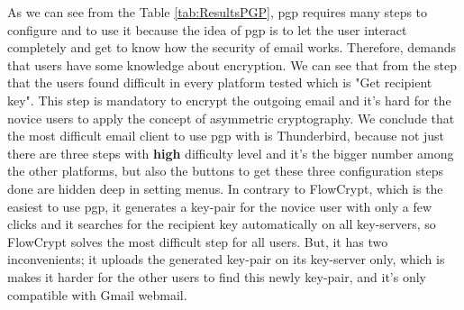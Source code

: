 As we can see from the Table \ref{tab:ResultsPGP}, \acrshort{pgp} requires many steps to configure and to use it because the idea of \acrshort{pgp} is to let the user interact completely and get to know how the security of email works. Therefore, demands that users have some knowledge about encryption. We can see that from the step that the users found difficult in every platform tested which is "Get recipient key". This step is mandatory to encrypt the outgoing email and it’s hard for the novice users to apply the concept of asymmetric cryptography. We conclude that the most difficult email client to use \acrshort{pgp} with is Thunderbird, because not just there are three steps with \textbf{high} difficulty level and it's the bigger number among the other platforms, but also the buttons to get these three configuration steps done are hidden deep in setting menus. In contrary to FlowCrypt, which is the easiest to use \acrshort{pgp}, it generates a key-pair for the novice user with only a few clicks and it searches for the recipient key automatically on all key-servers, so FlowCrypt solves the most difficult step for all users. But, it has two inconvenients; it uploads the generated key-pair on its key-server only, which is makes it harder for the other users to find this newly key-pair, and it's only compatible with Gmail webmail.

